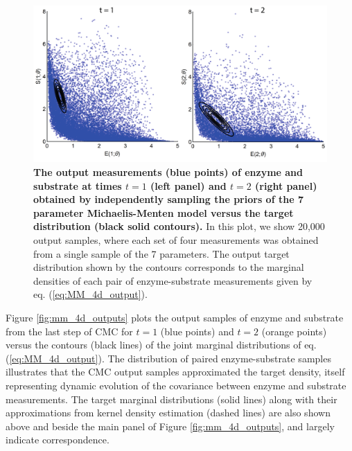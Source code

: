 \documentclass[10pt,letterpaper]{article}
\begin{document}
\begin{figure}[H]
	\centerline{\includegraphics[width=\textwidth]{../figures/mm_4d_main.pdf}}
	\caption{\textbf{The output measurements (blue points) of enzyme and substrate at times $t=1$ (left panel) and $t=2$ (right panel) obtained by independently sampling the priors of the 7 parameter Michaelis-Menten model versus the target distribution (black solid contours).} In this plot, we show 20,000 output samples, where each set of four measurements was obtained from a single sample of the 7 parameters. The output target distribution shown by the contours corresponds to the marginal densities of each pair of enzyme-substrate measurements given by eq. (\ref{eq:MM_4d_output}).}
	\label{fig:mm_4d_main}
\end{figure}


Figure \ref{fig:mm_4d_outputs} plots the output samples of enzyme and substrate from the last step of CMC for $t=1$ (blue points) and $t=2$ (orange points) versus the contours (black lines) of the joint marginal distributions of eq. (\ref{eq:MM_4d_output}). The distribution of paired enzyme-substrate samples illustrates that the CMC output samples approximated the target density, itself representing dynamic evolution of the covariance between enzyme and substrate measurements. The target marginal distributions (solid lines) along with their approximations from kernel density estimation (dashed lines) are also shown above and beside the main panel of Figure \ref{fig:mm_4d_outputs}, and largely indicate correspondence.
\end{document}
